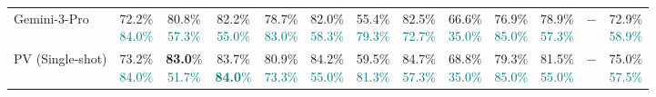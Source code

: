 \begin{table}[t]
{\begin{tabular}{@{}lcccccccccc@{}}
    \midrule
    Gemini-3-Pro & \shortstack{72.2\% \\ \textcolor{teal}{\scriptsize 84.0\%}} & \shortstack{80.8\% \\ \textcolor{teal}{\scriptsize 57.3\%}} & \shortstack{82.2\% \\ \textcolor{teal}{\scriptsize 55.0\%}} & \shortstack{78.7\% \\ \textcolor{teal}{\scriptsize 83.0\%}} & \shortstack{82.0\% \\ \textcolor{teal}{\scriptsize 58.3\%}} & \shortstack{55.4\% \\ \textcolor{teal}{\scriptsize 79.3\%}} & \shortstack{82.5\% \\ \textcolor{teal}{\scriptsize 72.7\%}} & \shortstack{66.6\% \\ \textcolor{teal}{\scriptsize 35.0\%}} & \shortstack{76.9\% \\ \textcolor{teal}{\scriptsize 85.0\%}} & \shortstack{78.9\% \\ \textcolor{teal}{\scriptsize 57.3\%}} & $-$ & \shortstack{72.9\% \\ \textcolor{teal}{\scriptsize 58.9\%}} \\
    PV (Single-shot) & \shortstack{73.2\% \\ \textcolor{teal}{\scriptsize 84.0\%}} & \shortstack{\textbf{83.0}\% \\ \textcolor{teal}{\scriptsize 51.7\%}} & \shortstack{83.7\% \\ \textcolor{teal}{\scriptsize \textbf{84.0}\%}} & \shortstack{80.9\% \\ \textcolor{teal}{\scriptsize 73.3\%}} & \shortstack{84.2\% \\ \textcolor{teal}{\scriptsize 55.0\%}} & \shortstack{59.5\% \\ \textcolor{teal}{\scriptsize 81.3\%}} & \shortstack{84.7\% \\ \textcolor{teal}{\scriptsize 57.3\%}} & \shortstack{68.8\% \\ \textcolor{teal}{\scriptsize 35.0\%}} & \shortstack{79.3\% \\ \textcolor{teal}{\scriptsize 85.0\%}} & \shortstack{81.5\% \\ \textcolor{teal}{\scriptsize 55.0\%}} & $-$ & \shortstack{75.0\% \\ \textcolor{teal}{\scriptsize 57.5\%}} \\

\end{tabular}}
\end{table}

